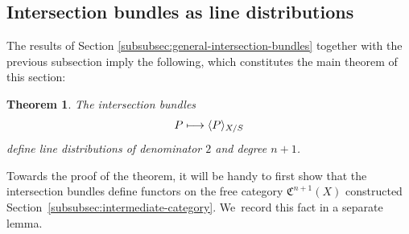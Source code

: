 \documentclass[11pt]{article}
\newcommand\mto{\mathchoice{\longmapsto}{\mapsto}{\mapsto}{\mapsto}}
\theoremstyle{plain}
\newtheorem{theorem}{Theorem}[section]
\theoremstyle{definition}
\newcommand{\Cfrak}{\mathfrak C}
\begin{document}
\subsection{Intersection bundles as line distributions}\label{subsec:Intbunaslindib}

The results of Section \ref{subsubsec:general-intersection-bundles} together with the previous subsection imply the following, which constitutes the main theorem of this section:

\begin{theorem}\label{thm:Elkik-distribution}
The intersection bundles
\begin{displaymath}
P \mto \langle P \rangle_{X/S}
\end{displaymath} define line distributions of denominator $2$ and degree $n+1$.
\end{theorem}

Towards the proof of the theorem, it will be handy to first show that the intersection bundles define functors on the free category $\Cfrak^{n+1}(X)$ constructed Section~\ref{subsubsec:intermediate-category}. We~record this fact in a separate lemma.
\end{document}
